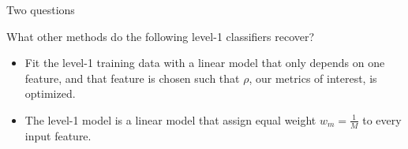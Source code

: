 \documentclass[10pt,compress,t,notes=noshow, xcolor=table]{beamer}
\begin{document}

\begin{vbframe}{Two questions}

\vfill
What other methods do the following level-1 classifiers recover?
\vfill
\begin{itemize}
    \item Fit the level-1 training data with a linear model that only depends on one feature, and that feature is chosen such that $\rho$, our metrics of interest, is optimized.
    \item The level-1 model is a linear model that assign equal weight $w_{m} = \frac{1}{M}$ to every input feature.
\end{itemize}
\vfill
    
\end{vbframe}

\end{document}
